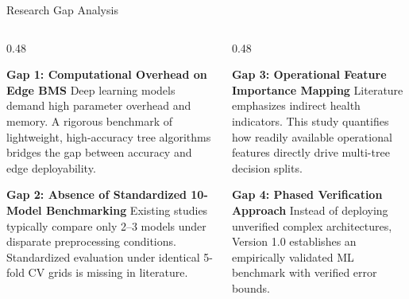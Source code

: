 \documentclass[aspectratio=169, 10pt]{beamer}
\begin{document}
\begin{frame}{Research Gap Analysis}
\begin{columns}[T]
  \begin{column}{0.48\textwidth}
    \begin{block}{\textbf{Gap 1: Computational Overhead on Edge BMS}}
      \footnotesize Deep learning models demand high parameter overhead and memory. A rigorous benchmark of lightweight, high-accuracy tree algorithms bridges the gap between accuracy and edge deployability.
    \end{block}
    \vspace{0.3em}
    \begin{block}{\textbf{Gap 2: Absence of Standardized 10-Model Benchmarking}}
      \footnotesize Existing studies typically compare only 2--3 models under disparate preprocessing conditions. Standardized evaluation under identical 5-fold CV grids is missing in literature.
    \end{block}
  \end{column}

  \begin{column}{0.48\textwidth}
    \begin{block}{\textbf{Gap 3: Operational Feature Importance Mapping}}
      \footnotesize Literature emphasizes indirect health indicators. This study quantifies how readily available operational features directly drive multi-tree decision splits.
    \end{block}
    \vspace{0.3em}
    \begin{block}{\textbf{Gap 4: Phased Verification Approach}}
      \footnotesize Instead of deploying unverified complex architectures, Version 1.0 establishes an empirically validated ML benchmark with verified error bounds.
    \end{block}
  \end{column}
\end{columns}
\end{frame}
\end{document}
